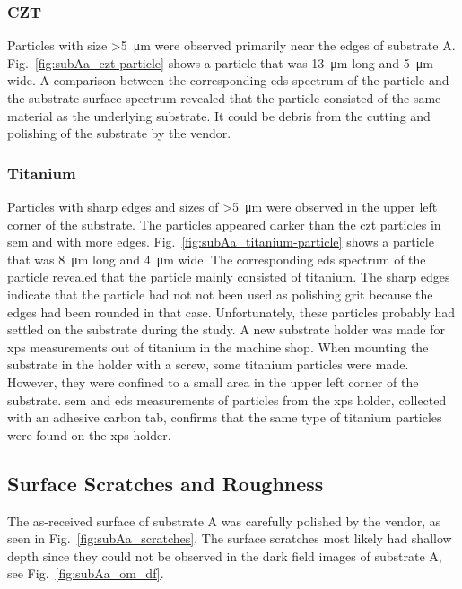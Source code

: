 \subsubsection{CZT}
Particles with size \SI{>5}{\micro\metre} were observed primarily near the edges of substrate A. Fig.~\ref{fig:subAa_czt-particle} shows a particle that was \SI{13}{\micro\metre} long and \SI{5}{\micro\metre} wide. A comparison between the corresponding \ac{eds} spectrum of the particle and the substrate surface spectrum revealed that the particle consisted of the same material as the underlying substrate. It could be debris from the cutting and polishing of the substrate by the vendor.


\subsubsection{Titanium}
Particles with sharp edges and sizes of \SI{>5}{\micro\metre} were observed in the upper left corner of the substrate. The particles appeared darker than the \ac{czt} particles in \ac{sem} and with more edges. Fig.~\ref{fig:subAa_titanium-particle} shows a particle that was \SI{8}{\micro\metre} long and \SI{4}{\micro\metre} wide. The corresponding \ac{eds} spectrum of the particle revealed that the particle mainly consisted of titanium. The sharp edges indicate that the particle had not not been used as polishing grit because the edges had been rounded in that case. Unfortunately, these particles probably had settled on the substrate during the study. A new substrate holder was made for \ac{xps} measurements out of titanium in the machine shop. When mounting the substrate in the holder with a screw, some titanium particles were made. However, they were confined to a small area in the upper left corner of the substrate. \Ac{sem} and \ac{eds} measurements of particles from the \ac{xps} holder, collected with an adhesive carbon tab, confirms that the same type of titanium particles were found on the \ac{xps} holder. %



\subsection{Surface Scratches and Roughness}
The as-received surface of substrate A was carefully polished by the vendor, as seen in Fig.~\ref{fig:subAa_scratches}. The surface scratches most likely had shallow depth since they could not be observed in the dark field images of substrate A, see Fig.~\ref{fig:subAa_om_df}.

